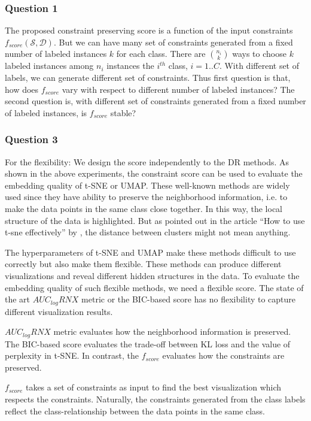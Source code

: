 \subsubsection*{Question 1}
The proposed constraint preserving score is a function of the input constraints $f_{score}(\mathcal{S}, \mathcal{D})$.
But we can have many set of constraints generated from a fixed number of labeled instances $k$ for each class.
There are ${n_i} \choose k$ ways to choose $k$ labeled instances among $n_i$ instances the $i^{th}$ class, $i = 1..C$.
With different set of labels, we can generate different set of constraints.
Thus first question is that, how does $f_{score}$ vary with respect to different number of labeled instances?
The second question is, with different set of constraints generated from a fixed number of labeled instances, is $f_{score}$ stable?


\subsubsection*{Question 3}
For the flexibility:
We design the score independently to the DR methods.
As shown in the above experiments, the constraint score can be used to evaluate the embedding quality of t-SNE or UMAP.
These well-known methods are widely used since they have ability to preserve the neighborhood information, i.e. to make the data points in the same class close together.
In this way, the local structure of the data is highlighted.
But as pointed out in the article ``How to use t-sne effectively'' by \citet{wattenberg2016use}, the distance between clusters might not mean anything.

The hyperparameters of t-SNE and UMAP make these methods difficult to use correctly but also make them flexible.
These methods can produce different visualizations and reveal different hidden structures in the data.
To evaluate the embedding quality of such flexible methods, we need a flexible score.
The state of the art $AUC_{log}RNX$ metric or the BIC-based score has no flexibility to capture different visualization results.

$AUC_{log}RNX$ metric evaluates how the neighborhood information is preserved.
The BIC-based score evaluates the trade-off between KL loss and the value of perplexity in t-SNE.
In contrast, the $f_{score}$ evaluates how the constraints are preserved.

$f_{score}$ takes a set of constraints as input to find the best visualization which respects the constraints.
Naturally, the constraints generated from the class labels reflect the class-relationship between the data points in the same class.


